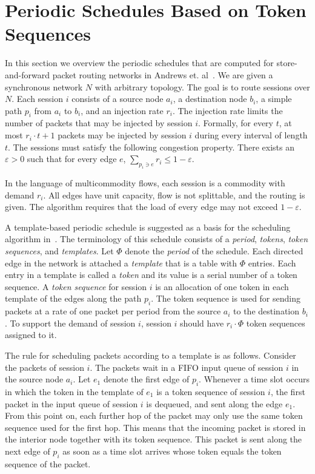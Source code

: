 \documentclass[a4paper,12pt]{article}
\newenvironment{proof sketch}[1]{\noindent {\emph{Proof sketch of #1:}}}{\hfill \qed}
\begin{document}
\section{Periodic Schedules Based on Token Sequences}\label{sec:token}
In this section we overview the periodic schedules that are computed for
store-and-forward packet routing networks in Andrews et.
al~\cite{andrews2000general}.  We are given a synchronous network $N$ with arbitrary
topology. The goal is to route sessions over $N$.  Each session $i$ consists of a
source node $a_i$, a destination node $b_i$, a simple path $p_i$ from $a_i$ to $b_i$,
and an injection rate $r_i$. The injection rate limits the number of packets that may
be injected by session $i$. Formally, for every $t$, at most $r_i\cdot t +1$ packets
may be injected by session $i$ during every interval of length $t$. The sessions must
satisfy the following congestion property.  There exists an $\varepsilon>0$ such that
for every edge $e$, $\sum_{p_i\ni e} r_i \leq 1-\varepsilon$.

In the language of multicommodity flows, each session is a commodity with demand
$r_i$. All edges have unit capacity, flow is not splittable, and the routing is given.
The algorithm requires that the load of every edge may not exceed $1-\varepsilon$.

A template-based periodic schedule is suggested as a basis for the scheduling
algorithm in~\cite{andrews2000general}.  The terminology of this schedule consists of
a \emph{period}, \emph{tokens}, \emph{token sequences}, and \emph{templates}.  Let
$\Phi$ denote the \emph{period} of the schedule.  Each directed edge in the network
is attached a \emph{template} that is a table with $\Phi$ entries.  Each entry in a
template is called a \emph{token} and its value is a serial number of a token
sequence.  A \emph{token sequence} for session $i$ is an allocation of one token in
each template of the edges along the path $p_i$. The token sequence is used for
sending packets at a rate of one packet per period from the source $a_i$ to the
destination $b_i$.  To support the demand of session $i$, session $i$ should have
$r_i\cdot \Phi$ token sequences assigned to it.

The rule for scheduling packets according to a template is as follows. Consider the
packets of session $i$. The packets wait in a FIFO input queue of session $i$ in the
source node $a_i$.  Let $e_1$ denote the first edge of $p_i$.  Whenever a time slot
occurs in which the token in the template of $e_1$ is a token sequence of session $i$,
the first packet in the input queue of session $i$ is dequeued, and sent along the
edge $e_1$. From this point on, each further hop of the packet may only use the same
token sequence used for the first hop. This means that the incoming packet is stored
in the interior node together with its token sequence. This packet is sent along the
next edge of $p_i$ as soon as a time slot arrives whose token equals the token
sequence of the packet.
\end{document}
